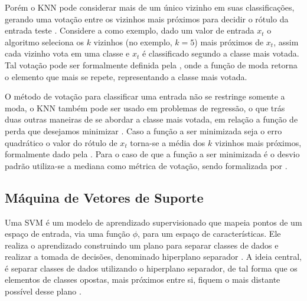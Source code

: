 Porém o \acrshort{KNN} pode considerar mais de um único vizinho em suas classificações, gerando uma votação entre os vizinhos mais próximos para decidir o rótulo da entrada teste \cite{faceli2011inteligencia}. Considere a  como exemplo, dado um valor de entrada $x_t$ o algoritmo seleciona os $k$ vizinhos (no exemplo, $k=5$)  mais próximos de $x_t$, assim cada vizinho vota em uma classe e $x_t$ é classificado segundo a classe mais votada. Tal votação pode ser formalmente definida pela , onde a função de moda retorna o elemento que mais se repete, representando a classe mais votada.

%

O método de votação para classificar uma entrada não se restringe somente a moda, o \acrshort{KNN} também pode ser usado em problemas de regressão, o
que trás duas outras maneiras de se abordar a classe mais votada, em relação a função de perda que desejamos minimizar \cite{faceli2011inteligencia}. Caso a função a ser minimizada seja o erro quadrático o valor do rótulo de $x_t$ torna-se a média dos $k$ vizinhos mais próximos, formalmente dado pela  \cite{larose2014discovering}. Para o caso de que a função a ser minimizada é o desvio padrão utiliza-se a mediana como métrica de votação, sendo formalizada por .


\subsection{Máquina de Vetores de Suporte}
\label{sec:svm}

Uma \acrfull{SVM} \cite{boser1992training} é um modelo de aprendizado supervisionado que mapeia pontos de um espaço de entrada, via uma função $\phi$, para um espaço de características. Ele realiza o aprendizado construindo um plano para separar classes de dados e realizar a tomada de decisões, denominado hiperplano separador \cite{scholkopf2001learning}. A ideia central, é separar classes de dados utilizando o hiperplano separador, de tal forma que os elementos de classes opostas, mais próximos entre si, fiquem o mais distante possível desse plano \cite{hamel2011knowledge}.

